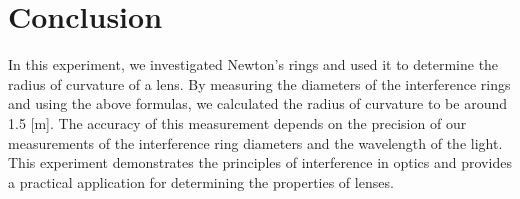 \section{Conclusion}

In this experiment, we investigated Newton's rings and used it to determine the radius of curvature of a lens. By measuring the diameters of the interference rings and using the above formulas, we calculated the radius of curvature to be around 1.5 [m]. The accuracy of this measurement depends on the precision of our measurements of the interference ring diameters and the wavelength of the light. This experiment demonstrates the principles of interference in optics and provides a practical application for determining the properties of lenses.